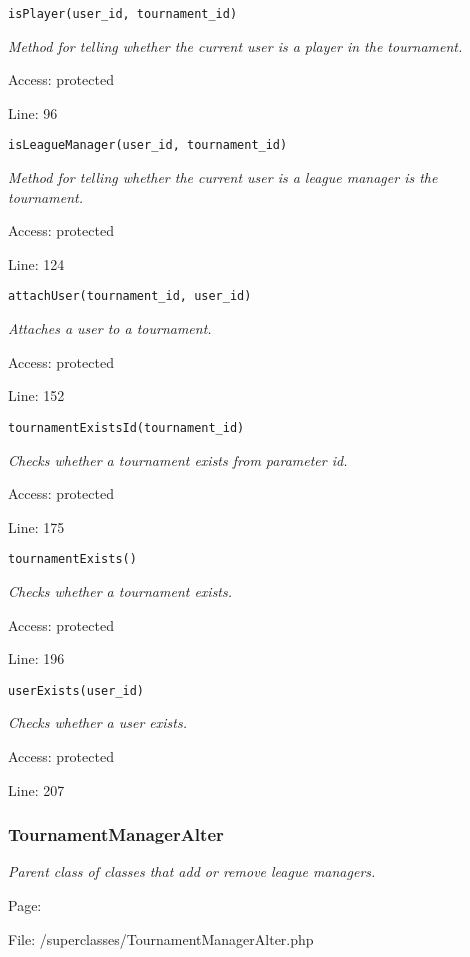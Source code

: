 \texttt{isPlayer(user\_id, tournament\_id)}

{\scriptsize
\textit{Method for telling whether the current user is a player in the tournament.}

Access: protected

Line: 96

}

\texttt{isLeagueManager(user\_id, tournament\_id)}

{\scriptsize
\textit{Method for telling whether the current user is a league manager is the tournament.}

Access: protected

Line: 124

}

\texttt{attachUser(tournament\_id, user\_id)}

{\scriptsize
\textit{Attaches a user to a tournament.}

Access: protected

Line: 152

}

\texttt{tournamentExistsId(tournament\_id)}

{\scriptsize
\textit{Checks whether a tournament exists from parameter id.}

Access: protected

Line: 175

}

\texttt{tournamentExists()}

{\scriptsize
\textit{Checks whether a tournament exists.}

Access: protected

Line: 196

}

\texttt{userExists(user\_id)}

{\scriptsize
\textit{Checks whether a user exists.}

Access: protected

Line: 207

}

\subsubsection{TournamentManagerAlter}\label{TournamentManagerAlter.php.doc}
\textit{Parent class of classes that add or remove league managers.}

Page: \pageref{TournamentManagerAlter.php}

File: /superclasses/TournamentManagerAlter.php

